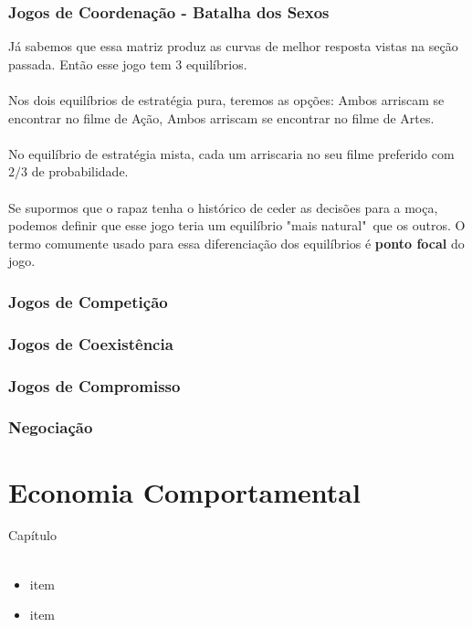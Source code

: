 \documentclass{beamer}[10]
\begin{document}
\begin{frame}
	\frametitle{Jogos de Coordenação - Batalha dos Sexos}

	Já sabemos que essa matriz produz as curvas de melhor resposta vistas na seção passada. Então esse jogo tem 3 equilíbrios. 
	\\~\\
	Nos dois equilíbrios de estratégia pura, teremos as opções: Ambos arriscam se encontrar no filme de Ação, Ambos arriscam se encontrar no filme de Artes. 
	\\~\\
	No equilíbrio de estratégia mista, cada um arriscaria no seu filme preferido com $2/3$ de probabilidade.
	\\~\\
	Se supormos que o rapaz tenha o histórico de ceder as decisões para a moça, podemos definir que esse jogo teria um equilíbrio "mais natural"\ que os outros. O termo comumente usado para essa diferenciação dos equilíbrios é \textbf{ponto focal} do jogo.

\end{frame}

\begin{frame}
	\frametitle{Jogos de Competição}

	

\end{frame}

\begin{frame}
	\frametitle{Jogos de Coexistência}

	

\end{frame}

\begin{frame}
	\frametitle{Jogos de Compromisso}

	

\end{frame}

\begin{frame}
	\frametitle{Negociação}

	

\end{frame}


\section[E.Comport.]{Economia Comportamental}
\begin{frame}
	\huge Capítulo \normalsize
	\\~\\
	\begin{itemize}
		\item item
		\item item
	\end{itemize}
\end{frame}
\end{document}
